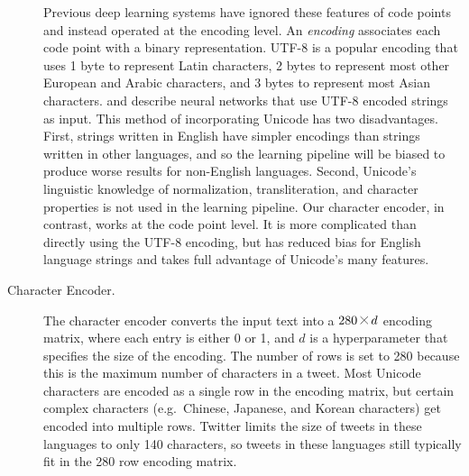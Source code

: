 \documentclass[sigconf,anonymous,review,10pt]{acmart}
\renewcommand{\times}{\mathbin{\tikz [x=1.4ex,y=1.4ex,line width=.1ex] \draw (0,0) -- (1,1) (0,1) -- (1,0);}}%
\newcommand{\defn}[1]{\textit{#1}}
\begin{document}
\begin{description}
Previous deep learning systems have ignored these features of code points and instead operated at the encoding level.
An \defn{encoding} associates each code point with a binary representation. 
UTF-8 is a popular encoding that uses 1 byte to represent Latin characters,
2 bytes to represent most other European and Arabic characters,
and 3 bytes to represent most Asian characters.
\citet{gillick2015multilingual} and \citet{plank2016multilingual} describe neural networks that use UTF-8 encoded strings as input.
This method of incorporating Unicode has two disadvantages.
First, strings written in English have simpler encodings than strings written in other languages,
and so the learning pipeline will be biased to produce worse results for non-English languages.
Second, Unicode's linguistic knowledge of normalization, transliteration, and character properties is not used in the learning pipeline.
Our character encoder, in contrast, works at the code point level.
It is more complicated than directly using the UTF-8 encoding,
but has reduced bias for English language strings and takes full advantage of Unicode's many features.

\item[Character Encoder.]
The character encoder converts the input text into a $280\times d$ encoding matrix,
where each entry is either 0 or 1,
and $d$ is a hyperparameter that specifies the size of the encoding.
The number of rows is set to 280 because this is the maximum number of characters in a tweet.
Most Unicode characters are encoded as a single row in the encoding matrix,
but certain complex characters (e.g.\ Chinese, Japanese, and Korean characters) get encoded into multiple rows.
Twitter limits the size of tweets in these languages to only 140 characters,
so tweets in these languages still typically fit in the 280 row encoding matrix.


\end{description}
\end{document}
